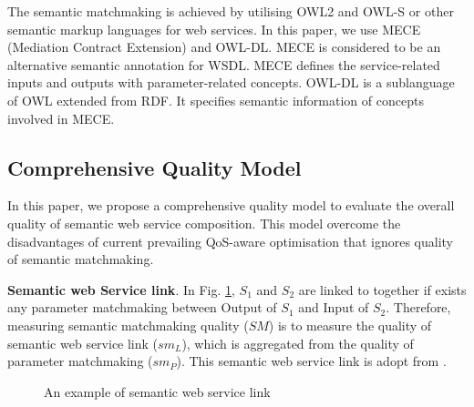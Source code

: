 \documentclass{IEEEtran}
\begin{document}
The semantic matchmaking is achieved by utilising OWL2 and OWL-S or other semantic markup languages for web services. In this paper, we use MECE (Mediation Contract Extension) \cite{bleul2008self} and OWL-DL. MECE is considered to be an alternative semantic annotation for WSDL. MECE defines the service-related inputs and outputs with parameter-related concepts. OWL-DL is a sublanguage of OWL extended from RDF. It specifies semantic information of concepts involved in MECE.

\subsection{Comprehensive Quality Model}\label{qualityModel}
In this paper, we propose a comprehensive quality model to evaluate the overall quality of semantic web service composition. This model overcome the disadvantages of current prevailing QoS-aware optimisation that ignores quality of semantic matchmaking.

\textbf{Semantic web Service link}. In Fig. \ref{semanticLink}, $S_{1}$ and $S_{2}$ are linked to together if exists any parameter matchmaking between  Output of $S_1$ and Input of $S_2$.  Therefore, measuring semantic matchmaking quality ($SM$) is to measure the quality of semantic web service link ($sm_{L}$), which is aggregated from the quality of parameter matchmaking ($sm_{P}$). This semantic web service link is adopt from \cite{lecue2009optimizing}.

\begin{figure}[h]
\centering
{}
 \caption{ An example of semantic web service link}
 \label{semanticLink}
\end{figure}
\end{document}
